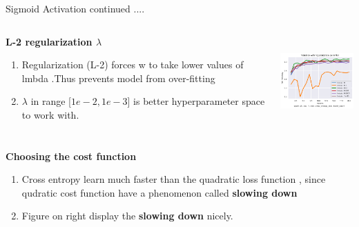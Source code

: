 \documentclass[12pt,t]{beamer}
\begin{document}
\begin{frame}[t]
    \large Sigmoid Activation continued ....
    
    \scriptsize

    \begin{columns}
        \begin{column}[T]{0.4\linewidth}
            \textbf{L-2 regularization $\lambda$}
                \scriptsize
                \begin{enumerate}
                    \item Regularization (L-2) forces w to take lower values of lmbda .Thus prevents model from over-fitting 
                    \item \textbf{$\lambda$} in range [$1e-2,1e-3$] is better hyperparameter space to work with.
                    
                \end{enumerate}
          
        \end{column}
        \begin{column}[T]{0.6\linewidth}
            \includegraphics[width=\linewidth,height=100pt]{sigmoid/variation_lmbda.png}
        \end{column}
    \end{columns}

    \begin{columns}
        \begin{column}[T]{0.4\linewidth}
            \textbf{Choosing the cost function}
                \scriptsize
                \begin{enumerate}
                    \item Cross entropy learn much faster than the quadratic loss function , since qudratic cost 
                        function have a phenomenon called \textbf{slowing down}
                    \item Figure on right display the \textbf{slowing down} nicely.
                    
                \end{enumerate}
          

\end{column}
\end{columns}
\end{frame}
\end{document}
